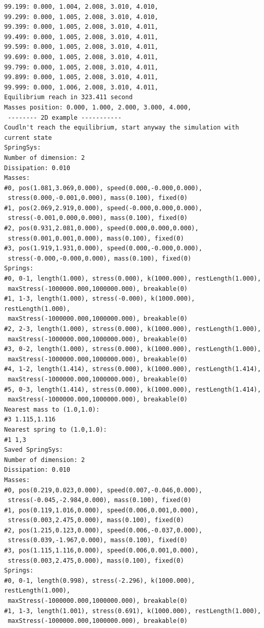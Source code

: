 \documentclass[12pt, a4paper]{article}
\begin{document}
\begin{scriptsize}
\begin{ttfamily}
\begin{lstlisting}
99.199: 0.000, 1.004, 2.008, 3.010, 4.010, 
99.299: 0.000, 1.005, 2.008, 3.010, 4.010, 
99.399: 0.000, 1.005, 2.008, 3.010, 4.011, 
99.499: 0.000, 1.005, 2.008, 3.010, 4.011, 
99.599: 0.000, 1.005, 2.008, 3.010, 4.011, 
99.699: 0.000, 1.005, 2.008, 3.010, 4.011, 
99.799: 0.000, 1.005, 2.008, 3.010, 4.011, 
99.899: 0.000, 1.005, 2.008, 3.010, 4.011, 
99.999: 0.000, 1.006, 2.008, 3.010, 4.011, 
Equilibrium reach in 323.411 second
Masses position: 0.000, 1.000, 2.000, 3.000, 4.000, 
 -------- 2D example -----------
Coudln't reach the equilibrium, start anyway the simulation with current state
SpringSys:
Number of dimension: 2
Dissipation: 0.010
Masses:
#0, pos(1.081,3.069,0.000), speed(0.000,-0.000,0.000),
 stress(0.000,-0.001,0.000), mass(0.100), fixed(0)
#1, pos(2.069,2.919,0.000), speed(-0.000,0.000,0.000),
 stress(-0.001,0.000,0.000), mass(0.100), fixed(0)
#2, pos(0.931,2.081,0.000), speed(0.000,0.000,0.000),
 stress(0.001,0.001,0.000), mass(0.100), fixed(0)
#3, pos(1.919,1.931,0.000), speed(0.000,-0.000,0.000),
 stress(-0.000,-0.000,0.000), mass(0.100), fixed(0)
Springs:
#0, 0-1, length(1.000), stress(0.000), k(1000.000), restLength(1.000),
 maxStress(-1000000.000,1000000.000), breakable(0)
#1, 1-3, length(1.000), stress(-0.000), k(1000.000), restLength(1.000),
 maxStress(-1000000.000,1000000.000), breakable(0)
#2, 2-3, length(1.000), stress(0.000), k(1000.000), restLength(1.000),
 maxStress(-1000000.000,1000000.000), breakable(0)
#3, 0-2, length(1.000), stress(0.000), k(1000.000), restLength(1.000),
 maxStress(-1000000.000,1000000.000), breakable(0)
#4, 1-2, length(1.414), stress(0.000), k(1000.000), restLength(1.414),
 maxStress(-1000000.000,1000000.000), breakable(0)
#5, 0-3, length(1.414), stress(0.000), k(1000.000), restLength(1.414),
 maxStress(-1000000.000,1000000.000), breakable(0)
Nearest mass to (1.0,1.0):
#3 1.115,1.116
Nearest spring to (1.0,1.0):
#1 1,3
Saved SpringSys:
Number of dimension: 2
Dissipation: 0.010
Masses:
#0, pos(0.219,0.023,0.000), speed(0.007,-0.046,0.000),
 stress(-0.045,-2.984,0.000), mass(0.100), fixed(0)
#1, pos(0.119,1.016,0.000), speed(0.006,0.001,0.000),
 stress(0.003,2.475,0.000), mass(0.100), fixed(0)
#2, pos(1.215,0.123,0.000), speed(0.006,-0.037,0.000),
 stress(0.039,-1.967,0.000), mass(0.100), fixed(0)
#3, pos(1.115,1.116,0.000), speed(0.006,0.001,0.000),
 stress(0.003,2.475,0.000), mass(0.100), fixed(0)
Springs:
#0, 0-1, length(0.998), stress(-2.296), k(1000.000), restLength(1.000),
 maxStress(-1000000.000,1000000.000), breakable(0)
#1, 1-3, length(1.001), stress(0.691), k(1000.000), restLength(1.000),
 maxStress(-1000000.000,1000000.000), breakable(0)

\end{lstlisting}
\end{ttfamily}
\end{scriptsize}
\end{document}
